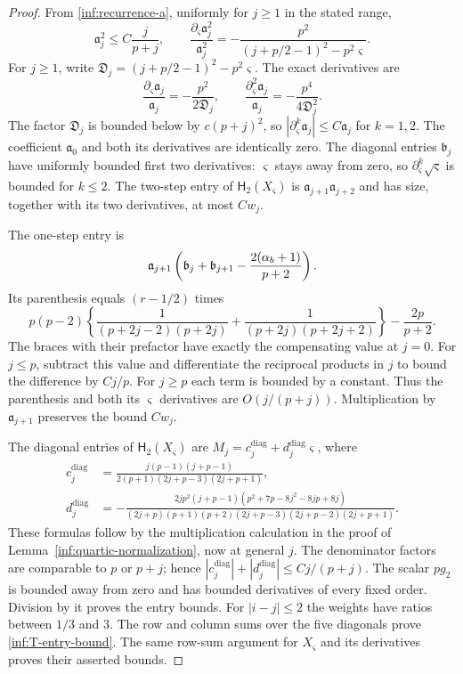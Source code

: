 \begin{proof}
From \eqref{inf:recurrence-a}, uniformly for $j\ge1$ in the stated range,
\[
 \mathfrak a_j^2\le C\frac j{p+j},\qquad
 \frac{\partial_\varsigma\mathfrak a_j^2}{\mathfrak a_j^2}
 =-\frac{p^2}{(j+p/2-1)^2-p^2\varsigma}.
\]
For $j\ge1$, write
$\mathfrak D_j=(j+p/2-1)^2-p^2\varsigma$. The exact derivatives are
\begin{equation}\label{inf:angular-second-derivative}
 \frac{\partial_\varsigma\mathfrak a_j}{\mathfrak a_j}
 =-\frac{p^2}{2\mathfrak D_j},\qquad
 \frac{\partial_\varsigma^2\mathfrak a_j}{\mathfrak a_j}
 =-\frac{p^4}{4\mathfrak D_j^2}.
\end{equation}
The factor $\mathfrak D_j$ is bounded below by $c(p+j)^2$,
so $|\partial_\varsigma^k\mathfrak a_j|\le C\mathfrak a_j$
for $k=1,2$. The coefficient $\mathfrak a_0$ and both its
derivatives are identically zero. The diagonal entries $\mathfrak b_j$ have uniformly
bounded first two derivatives: $\varsigma$ stays away from zero, so
$\partial_\varsigma^k\sqrt \varsigma$ is bounded for $k\le2$.
The two-step entry of $\mathsf H_2(X_\varsigma)$ is
$\mathfrak a_{j+1}\mathfrak a_{j+2}$ and has size, together with its
two derivatives, at most $Cw_j$.

The one-step entry is
\[
 \mathfrak a_{j+1}\left(\mathfrak b_j+\mathfrak b_{j+1}
                               -\frac{2(\alpha_b+1)}{p+2}\right).
\]
Its parenthesis equals $(r-1/2)$ times
\[
 p(p-2)\left\{
 \frac1{(p+2j-2)(p+2j)}+
 \frac1{(p+2j)(p+2j+2)}\right\}-\frac{2p}{p+2}.
\]
The braces with their prefactor have exactly the compensating value
at $j=0$. For $j\le p$, subtract this value and differentiate the
reciprocal products in $j$ to bound the difference by $Cj/p$.
For $j\ge p$ each term is bounded by a constant. Thus the
parenthesis and both its $\varsigma$ derivatives are $O(j/(p+j))$.
Multiplication by $\mathfrak a_{j+1}$ preserves the bound $Cw_j$.

The diagonal entries of $\mathsf H_2(X_\varsigma)$ are
$M_j=c_j^{\mathrm{diag}}+d_j^{\mathrm{diag}}\varsigma$, where
\begin{align}
 c_j^{\mathrm{diag}}&=\frac{j(p-1)(j+p-1)}{2(p+1)(2j+p-3)(2j+p+1)},
 \label{inf:T-diagonal}\\
 d_j^{\mathrm{diag}}&=-\frac{2jp^2(j+p-1)(p^2+7p-8j^2-8jp+8j)}
 {(2j+p)(p+1)(p+2)(2j+p-3)(2j+p-2)(2j+p+1)}.\nonumber
\end{align}
These formulas follow by the multiplication calculation in the proof
of Lemma~\ref{inf:quartic-normalization}, now at general $j$.
The denominator factors are comparable to $p$ or $p+j$;
hence $|c_j^{\mathrm{diag}}|+|d_j^{\mathrm{diag}}|\le Cj/(p+j)$.
The scalar $pg_2$ is bounded away from zero and has bounded derivatives
of every fixed order. Division by it proves the entry bounds.
For $|i-j|\le2$ the weights have ratios between $1/3$ and $3$.
The row and column sums over the five diagonals prove
\eqref{inf:T-entry-bound}. The same row-sum argument for $X_\varsigma$
and its derivatives proves their asserted bounds.


\end{proof}

